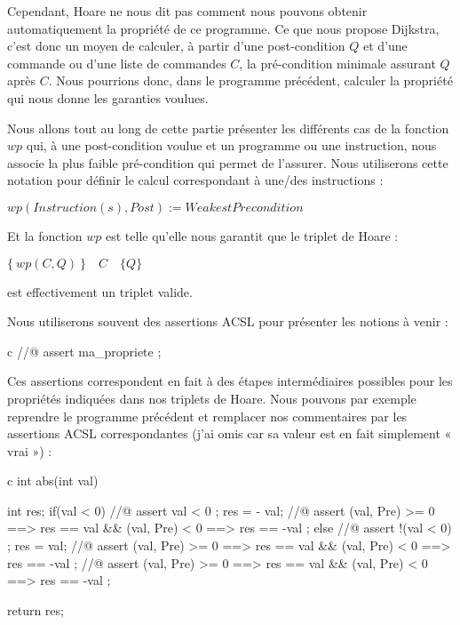 Cependant, Hoare ne nous dit pas comment nous pouvons obtenir automatiquement la 
propriété  de ce programme. Ce que nous propose Dijkstra, c'est donc un moyen
de calculer, à partir d'une post-condition $Q$ et d'une commande ou d'une liste de 
commandes $C$, la pré-condition minimale assurant $Q$ après $C$. Nous pourrions 
donc, dans le programme précédent, calculer la propriété  qui nous donne les
garanties voulues.



Nous allons tout au long de cette partie présenter les différents cas de la 
fonction $wp$ qui, à une post-condition voulue et un programme ou une instruction,
nous associe la plus faible pré-condition qui permet de l'assurer. Nous utiliserons
cette notation pour définir le calcul correspondant à une/des instructions :



$wp(Instruction(s), Post) := WeakestPrecondition$



Et la fonction $wp$ est telle qu'elle nous garantit que le triplet de Hoare :




\begin{center}
$\{\ wp(C,Q)\ \}\quad C\quad \{ Q \}$


\end{center}


est effectivement un triplet valide.



Nous utiliserons souvent des assertions ACSL pour présenter les notions à 
venir :



\begin{CodeBlock}{c}
//@ assert ma_propriete ;
\end{CodeBlock}



Ces assertions correspondent en fait à des étapes intermédiaires possibles pour
les propriétés indiquées dans nos triplets de Hoare. Nous pouvons par exemple
reprendre le programme précédent et remplacer nos commentaires par les assertions
ACSL correspondantes (j'ai omis  car sa valeur est en fait simplement
« vrai ») :



\begin{CodeBlock}{c}
int abs(int val){
  int res;
  if(val < 0){
    //@ assert val < 0 ;
    res = - val;
    //@ assert \at(val, Pre) >= 0 ==> res == val && \at(val, Pre) < 0 ==> res == -val ;
  } else {
    //@ assert !(val < 0) ;
    res = val;
    //@ assert \at(val, Pre) >= 0 ==> res == val && \at(val, Pre) < 0 ==> res == -val ;
  }
  //@ assert \at(val, Pre) >= 0 ==> res == val && \at(val, Pre) < 0 ==> res == -val ;

  return res;
}
\end{CodeBlock}


